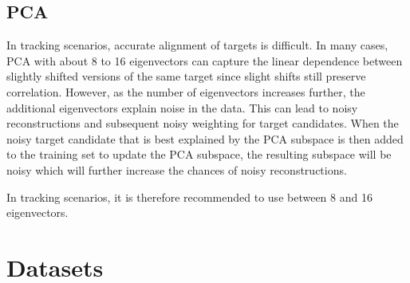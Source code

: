 \subsection{PCA}
In tracking scenarios, accurate alignment of targets is difficult.  In many cases, PCA with about 8 to 16 eigenvectors can capture the linear dependence between slightly shifted versions of the same target since slight shifts still preserve correlation.  However, as the number of eigenvectors increases further, the additional eigenvectors explain noise in the data.  This can lead to noisy reconstructions and subsequent noisy weighting for target candidates.  When the noisy target candidate that is best explained by the PCA subspace is then added to the training set to update the PCA subspace, the resulting subspace will be noisy which will further increase the chances of noisy reconstructions.  

In tracking scenarios, it is therefore recommended to use between 8 and 16 eigenvectors.

\appendix
\clearpage
\newpage
\section{Datasets}
\label{App:dataset_snapshots}

